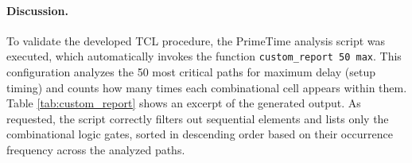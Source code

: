\documentclass[11pt,a4paper]{article}
\begin{document}
\paragraph{Discussion.} 
To validate the developed TCL procedure, the PrimeTime analysis script was executed, which automatically invokes the function \texttt{custom\_report 50 max}. This configuration analyzes the 50 most critical paths for maximum delay (setup timing) and counts how many times each combinational cell appears within them. Table \ref{tab:custom_report} shows an excerpt of the generated output. As requested, the script correctly filters out sequential elements and lists only the combinational logic gates, sorted in descending order based on their occurrence frequency across the analyzed paths.
\end{document}
